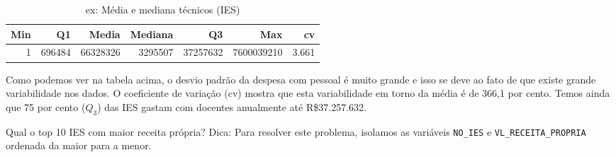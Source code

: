 \documentclass[11pt,]{style/krantz}
\makeatletter
\newenvironment{Shaded}{\begin{snugshade}}{\end{snugshade}}
\newcommand{\DataTypeTok}[1]{\textcolor[rgb]{0.13,0.29,0.53}{#1}}
\newcommand{\DecValTok}[1]{\textcolor[rgb]{0.00,0.00,0.81}{#1}}
\newcommand{\KeywordTok}[1]{\textcolor[rgb]{0.13,0.29,0.53}{\textbf{#1}}}
\newcommand{\NormalTok}[1]{#1}
\newcommand{\OperatorTok}[1]{\textcolor[rgb]{0.81,0.36,0.00}{\textbf{#1}}}
\newcommand{\OtherTok}[1]{\textcolor[rgb]{0.56,0.35,0.01}{#1}}
\newcommand{\StringTok}[1]{\textcolor[rgb]{0.31,0.60,0.02}{#1}}
\newenvironment{kframe}{%
\medskip{}
\setlength{\fboxsep}{.8em}
 \def\at@end@of@kframe{}%
 \ifinner\ifhmode%
  \def\at@end@of@kframe{\end{minipage}}%
  \begin{minipage}{\columnwidth}%
 \fi\fi%
 \def\FrameCommand##1{\hskip\@totalleftmargin \hskip-\fboxsep
 \colorbox{shadecolor}{##1}\hskip-\fboxsep
     \hskip-\linewidth \hskip-\@totalleftmargin \hskip\columnwidth}%
 \MakeFramed {\advance\hsize-\width
   \@totalleftmargin\z@ \linewidth\hsize
   \@setminipage}}%
 {\par\unskip\endMakeFramed%
 \at@end@of@kframe}
\renewenvironment{Shaded}{\begin{kframe}}{\end{kframe}}
\theoremstyle{definition}
\theoremstyle{definition}
\theoremstyle{definition}
\theoremstyle{remark}
\let\BeginKnitrBlock\begin \let\EndKnitrBlock\end
\makeatother
\begin{document}
\begin{Shaded}
\end{Shaded}

\begin{table}[!h]

\caption{\label{tab:unnamed-chunk-72}ex: Média e mediana técnicos (IES)}
\centering
\begin{tabular}{rrrrrrr}
\toprule
Min & Q1 & Media & Mediana & Q3 & Max & cv\\
\midrule
1 & 696484 & 66328326 & 3295507 & 37257632 & 7600039210 & 3.661\\
\bottomrule
\end{tabular}
\end{table}

\BeginKnitrBlock{solution}
\iffalse{} {Solução. } \fi{}Como podemos ver na tabela acima, o desvio padrão da despesa com pessoal é muito grande e isso se deve ao fato de que existe grande variabilidade nos dados. O coeficiente de variação (cv) mostra que esta variabilidade em torno da média é de 366,1 por cento. Temos ainda que 75 por cento (\(Q_3\)) das IES gastam com docentes anualmente até R\$37.257.632.
\EndKnitrBlock{solution}

\BeginKnitrBlock{exercise}
\protect\hypertarget{exr:unnamed-chunk-74}{}{\label{exr:unnamed-chunk-74} }Qual o top 10 IES com maior receita própria?
Dica: Para resolver este problema, isolamos as variáveis \texttt{NO\_IES} e \texttt{VL\_RECEITA\_PROPRIA} ordenada da maior para a menor.
\EndKnitrBlock{exercise}
\end{document}
